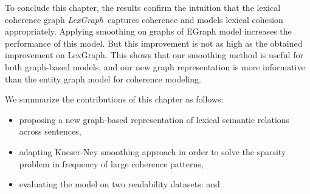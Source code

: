 To conclude this chapter, the results confirm the intuition that the lexical coherence graph \emph{LexGraph}\ captures coherence and models lexical cohesion appropriately.
Applying smoothing on graphs of EGraph model increases the performance of this model. 
But this improvement is not as high as the obtained improvement on LexGraph.
This shows that our smoothing method is useful for both graph-based models, and our new graph representation is more informative than the entity graph model for coherence modeling. 

We summarize the contributions of this chapter as follows:

\begin{itemize}

  \item proposing a new \mbox{graph-based} representation of lexical semantic relations across sentences,

  \item adapting \mbox{Kneser-Ney} smoothing approach in order to solve the sparsity problem in frequency of large coherence patterns,  

  \item evaluating the model on two readability datasets:  and .

\end{itemize}

